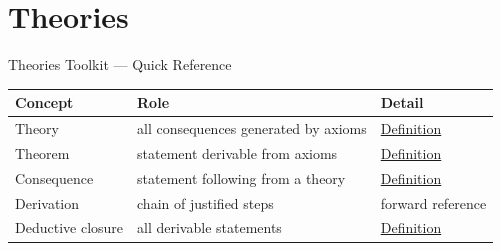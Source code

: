 \section{Theories}

\begin{toolkitbox}{Theories Toolkit --- Quick Reference}
\small
\begin{tabular}{l l l}
\toprule
\textbf{Concept} & \textbf{Role} & \textbf{Detail} \\
\midrule
Theory & all consequences generated by axioms & \hyperref[def:axiom-systems-theory]{Definition} \\
Theorem & statement derivable from axioms & \hyperref[def:axiom-systems-theorem]{Definition} \\
Consequence & statement following from a theory & \hyperref[def:axiom-systems-consequence]{Definition} \\
Derivation & chain of justified steps & forward reference \\
Deductive closure & all derivable statements & \hyperref[def:deductive-closure]{Definition} \\
\bottomrule
\end{tabular}
\end{toolkitbox}


